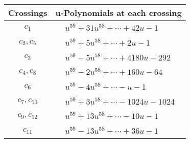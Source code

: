 \documentclass[1p]{elsarticle_modified}
\theoremstyle{definition}
\begin{document}
\begin{tabular}{m{50pt}|m{274pt}}
Crossings & \hspace{64pt}u-Polynomials at each crossing \\
\hline $$\begin{aligned}c_{1}\end{aligned}$$&$\begin{aligned}
&u^{59}+31 u^{58}+\cdots+42 u-1
\end{aligned}$\\
\hline $$\begin{aligned}c_{2},c_{5}\end{aligned}$$&$\begin{aligned}
&u^{59}+5 u^{58}+\cdots+2 u-1
\end{aligned}$\\
\hline $$\begin{aligned}c_{3}\end{aligned}$$&$\begin{aligned}
&u^{59}-5 u^{58}+\cdots+4180 u-292
\end{aligned}$\\
\hline $$\begin{aligned}c_{4},c_{8}\end{aligned}$$&$\begin{aligned}
&u^{59}-2 u^{58}+\cdots+160 u-64
\end{aligned}$\\
\hline $$\begin{aligned}c_{6}\end{aligned}$$&$\begin{aligned}
&u^{59}-4 u^{58}+\cdots- u-1
\end{aligned}$\\
\hline $$\begin{aligned}c_{7},c_{10}\end{aligned}$$&$\begin{aligned}
&u^{59}+3 u^{58}+\cdots-1024 u-1024
\end{aligned}$\\
\hline $$\begin{aligned}c_{9},c_{12}\end{aligned}$$&$\begin{aligned}
&u^{59}+13 u^{58}+\cdots-10 u-1
\end{aligned}$\\
\hline $$\begin{aligned}c_{11}\end{aligned}$$&$\begin{aligned}
&u^{59}-13 u^{58}+\cdots+36 u-1
\end{aligned}$\\
\hline
\end{tabular}\\~\\
\end{document}
